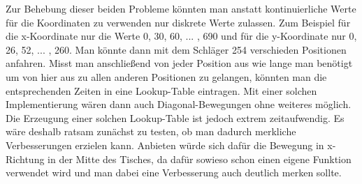Zur Behebung dieser beiden Probleme könnten man anstatt kontinuierliche Werte für die Koordinaten zu verwenden nur diskrete Werte zulassen. Zum Beispiel für die x-Koordinate nur die Werte 0, 30, 60, ... , 690 und für die y-Koordinate nur 0, 26, 52, ... , 260. Man könnte dann mit dem Schläger 254 verschieden Positionen anfahren. Misst man anschließend von jeder Position aus wie lange man benötigt um von hier aus zu allen anderen Positionen zu gelangen, könnten man die entsprechenden Zeiten in eine Lookup-Table eintragen. Mit einer solchen Implementierung wären dann auch Diagonal-Bewegungen ohne weiteres möglich. Die Erzeugung einer solchen Lookup-Table ist jedoch extrem zeitaufwendig. Es wäre deshalb ratsam zunächst zu testen, ob man dadurch merkliche Verbesserungen erzielen kann. Anbieten würde sich dafür die Bewegung in x-Richtung in der Mitte des Tisches, da dafür sowieso schon einen eigene Funktion verwendet wird und man dabei eine Verbesserung auch deutlich merken sollte. 